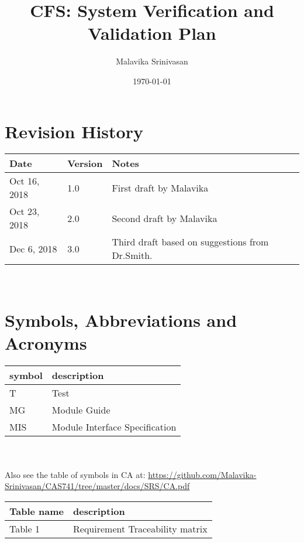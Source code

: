 \documentclass[12pt, titlepage]{article}
\begin{document}
\title{CFS: System Verification and Validation Plan
} 
\author{Malavika Srinivasan}
\date{\today}
	
\maketitle



\section{Revision History}

\begin{tabularx}{\textwidth}{p{3cm}p{2cm}X}
\toprule {\bf Date} & {\bf Version} & {\bf Notes}\\
\midrule
Oct 16, 2018 & 1.0 & First draft by Malavika\\
Oct 23, 2018 & 2.0 & Second draft by Malavika\\
Dec 6, 2018 & 3.0 & Third draft based on suggestions from Dr.Smith.\\

\bottomrule
\end{tabularx}

~\newpage

\section{Symbols, Abbreviations and Acronyms}
\renewcommand{\arraystretch}{1.2}
\begin{tabular}{l l} 
	\toprule		
	\textbf{symbol} & \textbf{description}\\
	\midrule 
	T & Test\\
	MG & Module Guide\\
	MIS & Module Interface Specification\\
	\bottomrule
\end{tabular}\\
\\
Also see the table of symbols in CA at: 
\url{https://github.com/Malavika-Srinivasan/CAS741/tree/master/docs/SRS/CA.pdf}\\


\newpage

\tableofcontents

\listoftables

\renewcommand{\arraystretch}{1.2}
\begin{tabular}{l l} 
	\toprule		
	\textbf{Table name} & \textbf{description}\\
	\midrule 
	Table 1 & Requirement Traceability matrix\\
	\bottomrule
\end{tabular}\\
\end{document}
